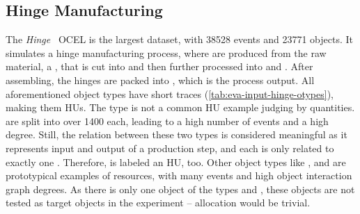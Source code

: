 \subsection{Hinge Manufacturing}
\label{ssec:eva-results-hinge}

The \textit{Hinge}~\cite{hinge} OCEL is the largest dataset, with 38528 events and 23771 objects.
It simulates a hinge manufacturing process, where  are produced from the raw material, a , that is cut into  and then further processed into  and . After assembling, the hinges are packed into , which is the process output. All aforementioned object types have short traces (\autoref{tab:eva-input-hinge-otypes}), making them HUs.
The  type is not a common HU example judging by quantities.  are split into over 1400  each, leading to a high number of events and a high degree.
Still, the relation between these two types is considered meaningful as it represents input and output of a production step, and each  is only related to exactly one . Therefore,  is labeled an HU, too.
Other object types like ,  and  are prototypical examples of resources, with many events and high object interaction graph degrees.
As there is only one object of the types  and , these objects are not tested as target objects in the experiment -- allocation would be trivial.


